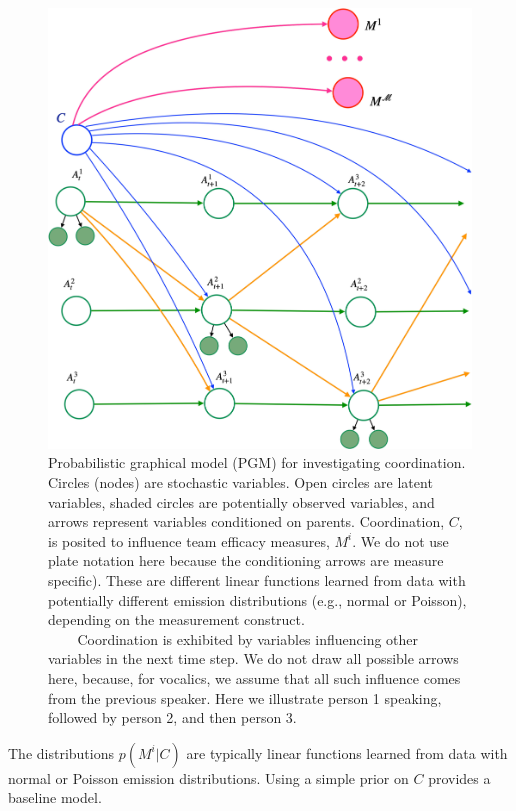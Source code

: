 %
    \begin{figure}
        \includegraphics[width=\textwidth]{images/prereg-pgm.pdf}
        \caption{%
            Probabilistic graphical model (PGM) for investigating coordination.
            Circles (nodes) are stochastic variables.  Open circles are latent
            variables, shaded circles are potentially observed variables, and
            arrows represent variables conditioned on parents.  Coordination,
            $C$, is posited to influence team efficacy measures, $M^i$.  We do
            not use plate notation here because the conditioning arrows are
            measure specific). These are different linear functions learned
            from data with potentially different emission distributions (e.g.,
            normal or Poisson), depending on the measurement construct. \\
            $~~~~~~~~$ Coordination is exhibited by variables influencing other
            variables in the next time step. We do not draw all possible arrows
            here, because, for vocalics, we assume that all  such influence
            comes from the previous speaker.  Here we illustrate person 1
            speaking, followed by person 2, and then person 3.
        }
        \label{fig:pgm}
    \end{figure}
%
    The distributions $p(M^i|C)$ are typically linear functions learned from data
    with normal or Poisson emission distributions. Using a simple prior on $C$
    provides a baseline model.

